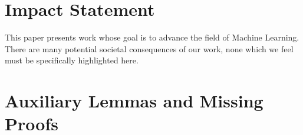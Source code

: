 \documentclass{article}
\theoremstyle{plain}
\newtheorem{lemma}[theorem]{Lemma}
\theoremstyle{definition}
\theoremstyle{remark}
\begin{document}
\section*{Impact Statement}

This paper presents work whose goal is to advance the field of Machine
Learning. There are many potential societal consequences of our work, none
which we feel must be specifically highlighted here.




\newpage
\appendix
\onecolumn

\section{Auxiliary Lemmas and Missing Proofs}\label{sec:app:proofs}

\end{document}

